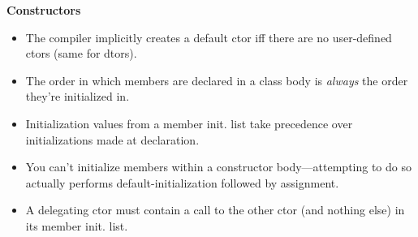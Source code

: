 \documentclass[7pt, twocolumn]{extarticle}
\begin{document}
\begin{small}


\begin{minipage}[h]{5.4cm} \small
\textcolor{headcolor}{\textbf{Constructors}} \smallskip

\begin{itemize}[leftmargin=*,align=parleft]
\setlength\itemsep{0pt}
\item[\textcolor{info}{{\faInfoCircle}}] The compiler implicitly creates a default ctor iff there are no user-defined ctors (same for dtors).
\item[\textcolor{info}{{\faInfoCircle}}] The order in which members are declared in a class body is \textit{always} the order they're initialized in.
\item[\textcolor{info}{{\faInfoCircle}}] Initialization values from a member init. list take precedence over initializations made at declaration.
\item[\textcolor{warning}{{\faWarning}}] You can't initialize members within a constructor body—attempting to do so actually performs default-initialization followed by assignment.
\item[\textcolor{error}{\faExclamationCircle}] A delegating ctor must contain a call to the other ctor (and nothing else) in its member init. list.
\end{itemize}

\end{minipage}
\end{small}
\end{document}

